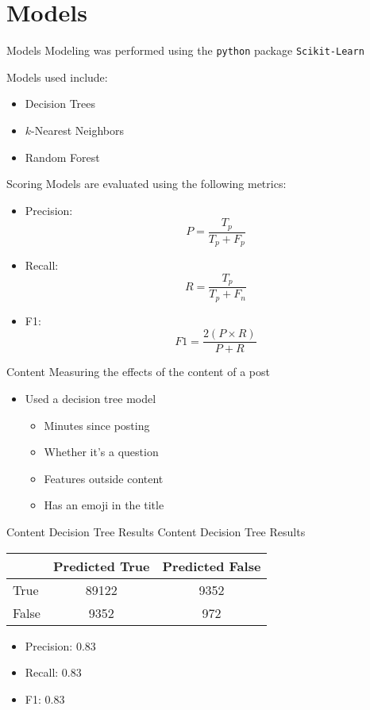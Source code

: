 \documentclass[10pt,t]{beamer}
\newcommand{\bi}{\begin{itemize}}                                 %
\newcommand{\ei}{\end{itemize}}                                   %
\begin{document}
\section{Models}

\begin{frame}{Models}
	Modeling was performed using the \texttt{python} package \texttt{Scikit-Learn}
	
	Models used include:
	\bi
		\item Decision Trees
		\item $k$-Nearest Neighbors
		\item Random Forest
	\ei
\end{frame}

\begin{frame}{Scoring}
Models are evaluated using the following metrics:
	\bi
		\item Precision: \begin{equation}P = \frac{T_{p}}{T_{p} + F_{p}}\end{equation}
		\item Recall: \begin{equation}R = \frac{T_{p}}{T_{p} + F_{n}}\end{equation}
		\item F1:\begin{equation}F1 = \frac{2(P \times R)}{P + R}\end{equation}
	\ei
\end{frame}

\begin{frame}{Content}
Measuring the effects of the content of a post
	\bi
		\item Used a decision tree model
		\bi
			\item Minutes since posting
			\item Whether it's a question
			\item Features outside content
			\item Has an emoji in the title
		\ei
	\ei
\end{frame}

\begin{frame}[c]{Content Decision Tree Results}
Content Decision Tree Results
\begin{table}
	\begin{tabular}{l | c | c }
		& Predicted True & Predicted False\\
		\hline \hline
		True & 89122 & 9352\\ 
		False & 9352 & 972
	\end{tabular}
\end{table}
\bi
	\item Precision: 0.83
	\item Recall: 0.83
	\item F1: 0.83
\ei
\end{frame}
\end{document}
